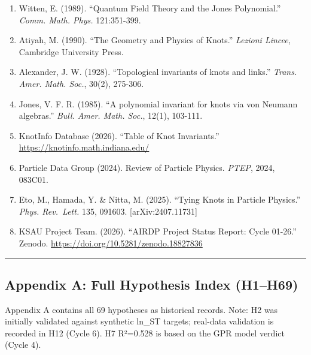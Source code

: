 \documentclass[
]{article}
\providecommand{\tightlist}{%
  \setlength{\itemsep}{0pt}\setlength{\parskip}{0pt}}
\begin{document}
\begin{enumerate}
\def\labelenumi{\arabic{enumi}.}
\tightlist
\item
  Witten, E. (1989). ``Quantum Field Theory and the Jones Polynomial.''
  \emph{Comm. Math. Phys.} 121:351-399.
\item
  Atiyah, M. (1990). ``The Geometry and Physics of Knots.''
  \emph{Lezioni Lincee}, Cambridge University Press.
\item
  Alexander, J. W. (1928). ``Topological invariants of knots and
  links.'' \emph{Trans. Amer. Math. Soc.}, 30(2), 275-306.
\item
  Jones, V. F. R. (1985). ``A polynomial invariant for knots via von
  Neumann algebras.'' \emph{Bull. Amer. Math. Soc.}, 12(1), 103-111.
\item
  KnotInfo Database (2026). ``Table of Knot Invariants.''
  \url{https://knotinfo.math.indiana.edu/}
\item
  Particle Data Group (2024). Review of Particle Physics. \emph{PTEP},
  2024, 083C01.
\item
  Eto, M., Hamada, Y. \& Nitta, M. (2025). ``Tying Knots in Particle
  Physics.'' \emph{Phys. Rev.~Lett.} 135, 091603. {[}arXiv:2407.11731{]}
\item
  KSAU Project Team. (2026). ``AIRDP Project Status Report: Cycle
  01-26.'' Zenodo. \url{https://doi.org/10.5281/zenodo.18827836}
\end{enumerate}

\begin{center}\rule{0.5\linewidth}{0.5pt}\end{center}

\subsection{Appendix A: Full Hypothesis Index
(H1--H69)}\label{appendix-a-full-hypothesis-index-h1h69}

Appendix A contains all 69 hypotheses as historical records. Note: H2
was initially validated against synthetic ln\_ST targets; real-data
validation is recorded in H12 (Cycle 6). H7 R²=0.528 is based on the GPR
model verdict (Cycle 4).
\end{document}

